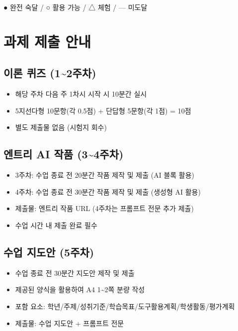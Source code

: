 \documentclass[a4paper,11pt]{article}
\begin{document}
\begin{quoteblock}
● 완전 숙달 / ○ 활용 가능 / △ 체험 / --- 미도달
\end{quoteblock}

\section{과제 제출 안내}

\subsection{이론 퀴즈 (1\textasciitilde{}2주차)}
\begin{itemize}[nosep]
\item 해당 주차 다음 주 1차시 시작 시 10분간 실시
\item 5지선다형 10문항(각 0.5점) + 단답형 5문항(각 1점) = 10점
\item 별도 제출물 없음 (시험지 회수)
\end{itemize}

\subsection{엔트리 AI 작품 (3\textasciitilde{}4주차)}
\begin{itemize}[nosep]
\item 3주차: 수업 종료 전 20분간 작품 제작 및 제출 (AI 블록 활용)
\item 4주차: 수업 종료 전 30분간 작품 제작 및 제출 (생성형 AI 활용)
\item 제출물: 엔트리 작품 URL (4주차는 프롬프트 전문 추가 제출)
\item 수업 시간 내 제출 완료 필수
\end{itemize}

\subsection{수업 지도안 (5주차)}
\begin{itemize}[nosep]
\item 수업 종료 전 30분간 지도안 제작 및 제출
\item 제공된 양식을 활용하여 A4 1\textasciitilde{}2쪽 분량 작성
\item 포함 요소: 학년/주제/성취기준/학습목표/도구활용계획/학생활동/평가계획
\item 제출물: 수업 지도안 + 프롬프트 전문
\end{itemize}
\end{document}
